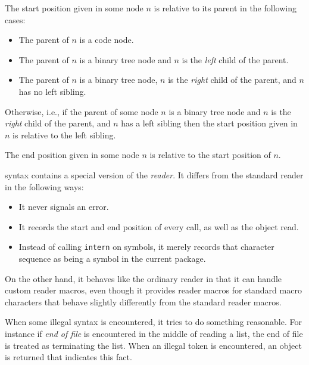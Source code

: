 The start position given in some node $n$ is relative to its parent in
the following cases:

\begin{itemize}
\item The parent of $n$ is a code node.
\item The parent of $n$ is a binary tree node and $n$ is the
  \emph{left} child of the parent.
\item The parent of $n$ is a binary tree node, $n$ is the
  \emph{right} child of the parent, and $n$ has no left sibling.
\end{itemize}

Otherwise, i.e., if the parent of some node $n$ is a binary tree node
and $n$ is the \emph{right} child of the parent, and $n$ has a left
sibling then the start position given in $n$ is relative to the left
sibling.

The end position given in some node $n$ is relative to the start
position of $n$.

\commonlisp{} syntax contains a special version of the \commonlisp{}
\emph{reader}.  It differs from the standard reader in the following
ways:

\begin{itemize}
\item It never signals an error.
\item It records the start and end position of every call, as well as
  the object read.
\item Instead of calling \texttt{intern} on symbols, it merely records
  that character sequence as being a symbol in the current package. 
\end{itemize}

On the other hand, it behaves like the ordinary \commonlisp{} reader
in that it can handle custom reader macros, even though it provides
reader macros for standard macro characters that behave slightly
differently from the standard reader macros.

When some illegal syntax is encountered, it tries to do something
reasonable.  For instance if \emph{end of file} is encountered in the
middle of reading a list, the end of file is treated as terminating
the list.  When an illegal token is encountered, an object is returned
that indicates this fact. 


